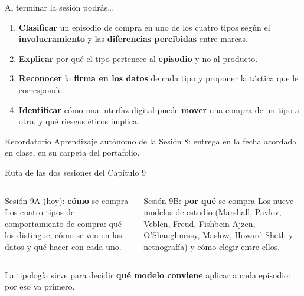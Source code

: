 \documentclass[aspectratio=169,xcolor=dvipsnames]{beamer}
\begin{document}
\begin{frame}{Al terminar la sesión podrás\ldots}
\begin{enumerate}
  \item \textbf{Clasificar} un episodio de compra en uno de los cuatro tipos según el \textbf{involucramiento} y las \textbf{diferencias percibidas} entre marcas.
  \vspace{4pt}
  \item \textbf{Explicar} por qué el tipo pertenece al \textbf{episodio} y no al producto.
  \vspace{4pt}
  \item \textbf{Reconocer} la \textbf{firma en los datos} de cada tipo y proponer la táctica que le corresponde.
  \vspace{4pt}
  \item \textbf{Identificar} cómo una interfaz digital puede \textbf{mover} una compra de un tipo a otro, y qué riesgos éticos implica.
\end{enumerate}
\vspace{6pt}
\begin{alertblock}{Recordatorio}
  Aprendizaje autónomo de la Sesión 8: entrega en la fecha acordada en clase, en su carpeta del portafolio.
\end{alertblock}
\end{frame}

\begin{frame}{Ruta de las dos sesiones del Capítulo 9}
\begin{columns}[T]
  \begin{block}{Sesión 9A (hoy): \textbf{cómo} se compra}
    \small Los cuatro tipos de comportamiento de compra: qué los distingue, cómo se ven en los datos y qué hacer con cada uno.
  \end{block}
  \begin{exampleblock}{Sesión 9B: \textbf{por qué} se compra}
    \small Los nueve modelos de estudio (Marshall, Pavlov, Veblen, Freud, Fishbein-Ajzen, O'Shaughnessy, Maslow, Howard-Sheth y netnografía) y cómo elegir entre ellos.
  \end{exampleblock}
\end{columns}
\vspace{6pt}
{\small\color{IPNgris} La tipología sirve para decidir \textbf{qué modelo conviene} aplicar a cada episodio: por eso va primero.}
\end{frame}
\end{document}
